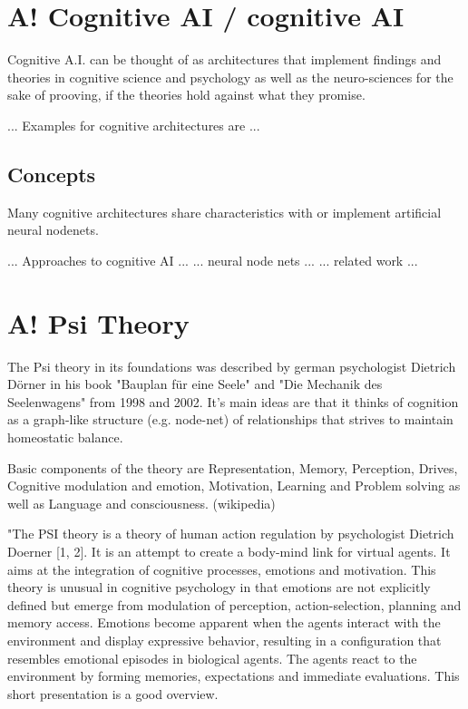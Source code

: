 \section{A! Cognitive AI / cognitive AI}
Cognitive A.I. can be thought of as architectures that implement findings and theories in cognitive science and psychology as well as the neuro-sciences for the sake of prooving, if the theories hold against what they promise. 

... Examples for cognitive architectures are ...
\subsection{Concepts}
Many cognitive architectures share characteristics with or implement artificial neural nodenets.

... Approaches to cognitive AI ...
... neural node nets ...
... related work ...

\section{A! Psi Theory}
The Psi theory in its foundations was described by german psychologist Dietrich Dörner in his book "Bauplan für eine Seele" and "Die Mechanik des Seelenwagens" from 1998 and 2002. It's main ideas are that it thinks of cognition as a graph-like structure (e.g. node-net) of relationships that strives to maintain homeostatic balance.\cite{Bach:2009:PSI:1611304}

Basic components of the theory are Representation, Memory, Perception, Drives, Cognitive modulation and emotion, Motivation, Learning and Problem solving as well as Language and consciousness. (wikipedia)

"The PSI theory is a theory of human action regulation by psychologist Dietrich Doerner [1, 2]. It is an attempt to create a body-mind link for virtual agents. It aims at the integration of cognitive processes, emotions and motivation. This theory is unusual in cognitive psychology in that emotions are not explicitly defined but emerge from modulation of perception, action-selection, planning and memory access. Emotions become apparent when the agents interact with the environment and display expressive behavior, resulting in a configuration that resembles emotional episodes in biological agents. The agents react to the environment by forming memories, expectations and immediate evaluations. This short presentation is a good overview.

